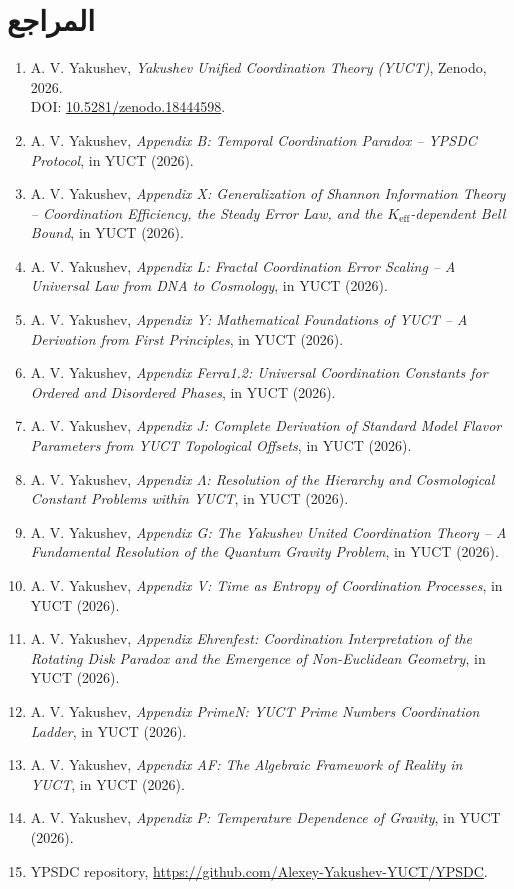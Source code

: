 \documentclass[12pt,a4paper]{article}
\begin{document}
	\section*{المراجع}
	\begin{enumerate}
		\item A. V. Yakushev, \emph{Yakushev Unified Coordination Theory (YUCT)}, Zenodo, 2026. \\ DOI: \href{https://doi.org/10.5281/zenodo.18444598}{10.5281/zenodo.18444598}.
		\item A. V. Yakushev, \emph{Appendix B: Temporal Coordination Paradox – YPSDC Protocol}, in YUCT (2026).
		\item A. V. Yakushev, \emph{Appendix X: Generalization of Shannon Information Theory – Coordination Efficiency, the Steady Error Law, and the \(K_{\mathrm{eff}}\)-dependent Bell Bound}, in YUCT (2026).
		\item A. V. Yakushev, \emph{Appendix L: Fractal Coordination Error Scaling – A Universal Law from DNA to Cosmology}, in YUCT (2026).
		\item A. V. Yakushev, \emph{Appendix Y: Mathematical Foundations of YUCT – A Derivation from First Principles}, in YUCT (2026).
		\item A. V. Yakushev, \emph{Appendix Ferra1.2: Universal Coordination Constants for Ordered and Disordered Phases}, in YUCT (2026).
		\item A. V. Yakushev, \emph{Appendix J: Complete Derivation of Standard Model Flavor Parameters from YUCT Topological Offsets}, in YUCT (2026).
		\item A. V. Yakushev, \emph{Appendix \(\Lambda\): Resolution of the Hierarchy and Cosmological Constant Problems within YUCT}, in YUCT (2026).
		\item A. V. Yakushev, \emph{Appendix G: The Yakushev United Coordination Theory – A Fundamental Resolution of the Quantum Gravity Problem}, in YUCT (2026).
		\item A. V. Yakushev, \emph{Appendix V: Time as Entropy of Coordination Processes}, in YUCT (2026).
		\item A. V. Yakushev, \emph{Appendix Ehrenfest: Coordination Interpretation of the Rotating Disk Paradox and the Emergence of Non-Euclidean Geometry}, in YUCT (2026).
		\item A. V. Yakushev, \emph{Appendix PrimeN: YUCT Prime Numbers Coordination Ladder}, in YUCT (2026).
		\item A. V. Yakushev, \emph{Appendix AF: The Algebraic Framework of Reality in YUCT}, in YUCT (2026).
		\item A. V. Yakushev, \emph{Appendix P: Temperature Dependence of Gravity}, in YUCT (2026).
		\item YPSDC repository, \url{https://github.com/Alexey-Yakushev-YUCT/YPSDC}.
	\end{enumerate}
	
\end{document}
